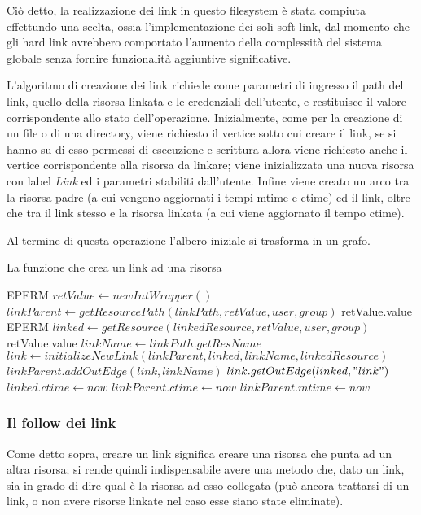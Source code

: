 Ciò detto, la realizzazione dei link in questo filesystem è stata compiuta effettundo una scelta, ossia l'implementazione dei soli soft link, dal momento che gli hard link avrebbero comportato l'aumento della complessità del sistema globale senza fornire funzionalità aggiuntive significative.

L'algoritmo di creazione dei link richiede come parametri di ingresso il path del link, quello della risorsa linkata e le credenziali dell'utente, e restituisce il valore corrispondente allo stato dell'operazione. Inizialmente, come per la creazione di un file o di una directory, viene richiesto il vertice sotto cui creare il link, se si hanno su di esso permessi di esecuzione e scrittura allora viene richiesto anche il vertice corrispondente alla risorsa da linkare; viene inizializzata una nuova risorsa con label \emph{Link} ed i parametri stabiliti dall'utente. Infine viene creato un arco tra la risorsa padre (a cui vengono aggiornati i tempi mtime e ctime) ed il link, oltre che tra il link stesso e la risorsa linkata (a cui viene aggiornato il tempo ctime). 

Al termine di questa operazione l'albero iniziale si trasforma in un grafo.

\begin{algorithm}
\begin{algorithmic}[5]
\caption{La funzione che crea un link ad una risorsa}
		\State \Return EPERM
	\EndIf
	\State $retValue \gets new IntWrapper()$
	\State $linkParent \gets getResourcePath(linkPath, retValue, user, group)$
		\State \Return retValue.value
	\EndIf
		\State \Return EPERM
	\EndIf
	\State $linked \gets getResource(linkedResource, retValue, user, group)$
		\State \Return retValue.value
	\EndIf
	\State $linkName \gets linkPath.getResName$
	\State $link \gets initializeNewLink(linkParent, linked, linkName, linkedResource)$
	\State $linkParent.addOutEdge(link, linkName)$
	\State $link.getOutEdge(linked, "link")$
	\State $linked.ctime \gets now$
	\State $linkParent.ctime \gets now$
	\State $linkParent.mtime \gets now$
	\State {}
\EndFunction
\end{algorithmic}
\end{algorithm}

\newpage

\subsubsection{Il follow dei link}
Come detto sopra, creare un link significa creare una risorsa che punta ad un altra risorsa; si rende quindi indispensabile avere una metodo che, dato un link, sia in grado di dire qual è la risorsa ad esso collegata (può ancora trattarsi di un link, o non avere risorse linkate nel caso esse siano state eliminate).

